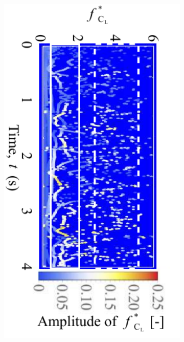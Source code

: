 \documentclass[oneside]{utmthesis}
\begin{document}
\begin{figure}[H]
  \centering
  \begin{subfigure}[h]{0.49\textwidth}
    \includegraphics[angle=90,width=1\textwidth]{figs/instantLiftFreq-a}
    \caption{}
    \label{fig:instantLiftFreq-a}
  \end{subfigure}
  \hfill
  \begin{subfigure}[h]{0.49\textwidth}

\end{subfigure}
\end{figure}
\end{document}
